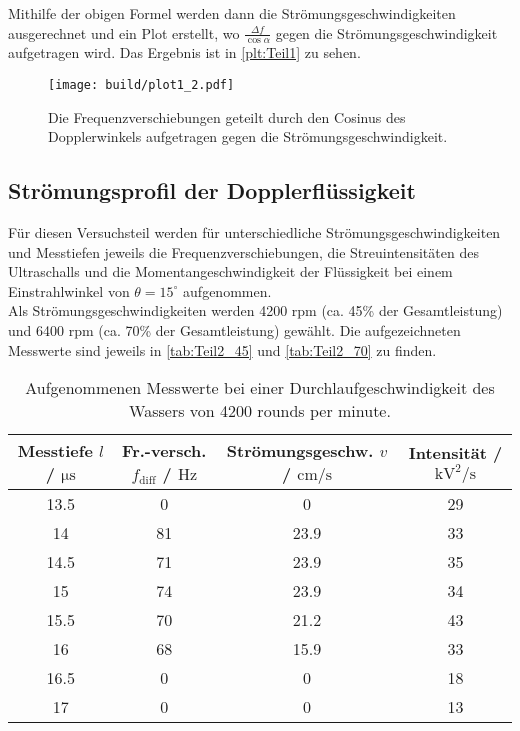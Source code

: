 Mithilfe der obigen Formel werden dann die Strömungsgeschwindigkeiten ausgerechnet und ein Plot erstellt,
wo $\frac{\Delta f}{\cos{\alpha}}$ gegen die Strömungsgeschwindigkeit aufgetragen wird. Das Ergebnis ist in 
\autoref{plt:Teil1} zu sehen.

\begin{figure}
  \centering
  \texttt{[image: build/plot1\_2.pdf]}
  \caption{Die Frequenzverschiebungen geteilt durch den Cosinus des Dopplerwinkels aufgetragen gegen 
  die Strömungsgeschwindigkeit.}
  \label{plt:Teil1}
\end{figure}


\subsection{Strömungsprofil der Dopplerflüssigkeit}

Für diesen Versuchsteil werden für unterschiedliche Strömungsgeschwindigkeiten und Messtiefen jeweils die
Frequenzverschiebungen, die Streuintensitäten des Ultraschalls und die Momentangeschwindigkeit der Flüssigkeit
bei einem Einstrahlwinkel von $\theta = 15^{\circ}$ aufgenommen.\\
Als Strömungsgeschwindigkeiten werden 4200 rpm (ca. 45\% der Gesamtleistung) und 6400 rpm (ca. 70\% der
Gesamtleistung) gewählt. Die aufgezeichneten Messwerte sind jeweils in \autoref{tab:Teil2_45} und 
\autoref{tab:Teil2_70} zu finden.\\

\begin{table}
  \centering
  \begin{tabular}{c | c | c | c}
    \toprule
    Messtiefe $l$ / $\si{\micro\second}$ & Fr.-versch. $f_{\mathrm{diff}}$ / $\si{\hertz}$ & Strömungsgeschw. $v$ / $\si{\centi\meter\per\second}$ & Intensität / $\si{\kilo\volt\squared\per\second}$ \\
    \midrule
    13.5        &    0      &     0         &      29\\
    14          &    81     &     23.9      &      33\\
    14.5        &    71     &     23.9      &      35\\
    15          &    74     &     23.9      &      34\\
    15.5        &    70     &     21.2      &      43\\
    16          &    68     &     15.9      &      33\\
    16.5        &    0      &     0         &      18\\
    17          &    0      &     0         &      13\\
    \bottomrule
  \end{tabular}
  \caption{Aufgenommenen Messwerte bei einer Durchlaufgeschwindigkeit des Wassers von 4200 rounds per minute.}
  \label{tab:Teil2_45}
\end{table}

